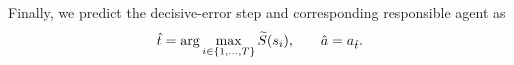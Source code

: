 Finally, we predict the decisive-error step and corresponding responsible
agent as
\begin{equation}
\small
    \hat{t}
    =
    \arg\max_{i\in\{1,\ldots,T\}}
    \widetilde{S}(s_i),
    \qquad
    \hat{a}
    =
    a_{\hat{t}}.
    \label{eq:prediction}
\end{equation}











